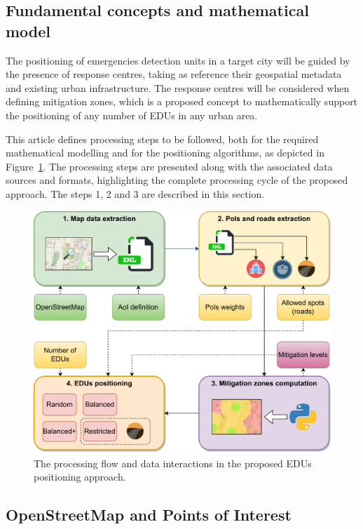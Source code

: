 \begin{refsection}
\section{Fundamental concepts and mathematical model}\label{S:3}

The positioning of emergencies detection units in a target city will be guided by the presence of response centres, taking as reference their geospatial metadata and existing urban infrastructure. The response centres will be considered when defining mitigation zones, which is a proposed concept to mathematically support the positioning of any number of EDUs in any urban area. 

This article defines processing steps to be followed, both for the required mathematical modelling and for the positioning algorithms, as depicted in Figure~\ref{Fig:figFluxograma}. The processing steps are presented along with the associated data sources and formats, highlighting the complete processing cycle of the proposed approach. The steps 1, 2 and 3 are described in this section.

\begin{figure}[htb!]
  \centering
  \includegraphics[width=0.85 \linewidth]{Chapters/3-EDUs/images/flowchart.drawio.pdf}
  \caption{The processing flow and data interactions in the proposed EDUs positioning approach.}\label{Fig:figFluxograma}
\end{figure}


\subsection{OpenStreetMap and Points of Interest}


\end{refsection}
